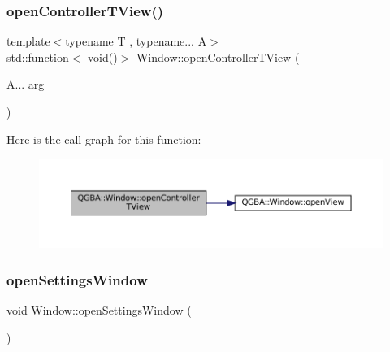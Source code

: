 \subsubsection{\texorpdfstring{open\+Controller\+T\+View()}{openControllerTView()}}
{\footnotesize\ttfamily template$<$typename T , typename... A$>$ \\
std\+::function$<$ void()$>$ Window\+::open\+Controller\+T\+View (\begin{DoxyParamCaption}\item[{A...}]{arg }\end{DoxyParamCaption})\hspace{0.3cm}{\ttfamily [private]}}

Here is the call graph for this function\+:
\nopagebreak
\begin{figure}[H]
\begin{center}
\leavevmode
\includegraphics[width=350pt]{class_q_g_b_a_1_1_window_a3660e2956b324697fecf11b138e832f0_cgraph}
\end{center}
\end{figure}
\mbox{\label{class_q_g_b_a_1_1_window_acf3797e7d048f6e0bda1e3a576b106f2}} 
\subsubsection{\texorpdfstring{open\+Settings\+Window}{openSettingsWindow}}
{\footnotesize\ttfamily void Window\+::open\+Settings\+Window (\begin{DoxyParamCaption}{ }\end{DoxyParamCaption})\hspace{0.3cm}{\ttfamily [slot]}}

